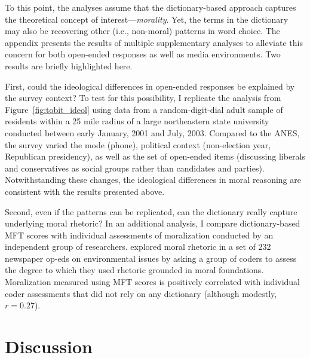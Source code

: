 \documentclass[12pt]{article}
\begin{document}
To this point, the analyses assume that the dictionary-based approach captures the theoretical concept of interest---\textit{morality}. Yet, the terms in the dictionary may also be recovering other (i.e., non-moral) patterns in word choice. The appendix presents the results of multiple supplementary analyses to alleviate this concern for both open-ended responses as well as media environments. Two results are briefly highlighted here.

First, could the ideological differences in open-ended responses be explained by the survey context? To test for this possibility, I replicate the analysis from Figure~\ref{fig:tobit_ideol} using data from a random-digit-dial adult sample of residents within a 25 mile radius of a large northeastern state university conducted between early January, 2001 and July, 2003. Compared to the ANES, the survey varied the mode (phone), political context (non-election year, Republican presidency), as well as the set of open-ended items (discussing liberals and conservatives as social groups rather than candidates and parties). Notwithstanding these changes, the ideological differences in moral reasoning are consistent with the results presented above.

Second, even if the patterns can be replicated, can the dictionary really capture underlying moral rhetoric? In an additional analysis, I compare dictionary-based MFT scores with individual assessments of moralization conducted by an independent group of researchers. \citet{feinberg2013moral} explored moral rhetoric in a set of 232 newspaper op-eds on environmental issues by asking a group of coders to assess the degree to which they used rhetoric grounded in moral foundations. Moralization measured using MFT scores is positively correlated with individual coder assessments that did not rely on any dictionary (although modestly, $r=0.27$).


\section*{Discussion}

\end{document}

